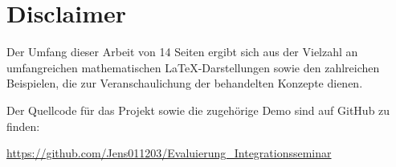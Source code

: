 \chapter*{Disclaimer}

Der Umfang dieser Arbeit von 14 Seiten ergibt sich aus der Vielzahl an umfangreichen mathematischen LaTeX-Darstellungen sowie den zahlreichen Beispielen, die zur Veranschaulichung der behandelten Konzepte dienen.

Der Quellcode für das Projekt sowie die zugehörige Demo sind auf GitHub zu finden:  

\url{https://github.com/Jens011203/Evaluierung_Integrationsseminar}
